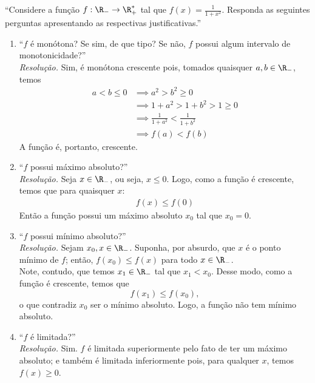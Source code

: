 \enquote{Considere a função $f: \R_- \rightarrow \R_+^*$ tal que $f(x) = \frac{1}{1 + x^2}$. Responda as seguintes perguntas apresentando as respectivas justificativas.}
\begin{enumerate}
    \item \enquote{$f$ é monótona? Se sim, de que tipo? Se não, $f$ possui algum intervalo de monotonicidade?} \\
    \emph{Resolução.} Sim, é monótona crescente pois, tomados quaisquer $a, b \in \R_-$, temos
    \begin{align*}
        a < b \le 0 & \implies a^2 > b^2 \ge 0 \\ & \implies
        1 + a^2 > 1 + b^2 > 1 \ge 0 \\ & \implies
        \frac{1}{1 + a^2} < \frac{1}{1 + b^2} \\ & \implies
        f(a) < f(b)
    \end{align*}
    A função é, portanto, crescente.
    \item \enquote{$f$ possui máximo absoluto?} \\
    \emph{Resolução.} Seja $x \in \R_-$, ou seja, $x \le 0$. Logo, como a função é crescente, temos que para quaisquer $x$:
    \begin{align*}
        f(x) \le f(0)
    \end{align*}
    Então a função possui um máximo absoluto $x_0$ tal que $x_0 = 0$. 
    \item \enquote{$f$ possui mínimo absoluto?} \\
    \emph{Resolução.} Sejam $x_0, x \in \R_-$. Suponha, por absurdo, que $x$ é o ponto mínimo de $f$; então, $f(x_0) \le f(x)$ para todo $x \in \R_-$. \\ Note, contudo, que temos $x_1 \in \R_-$ tal que $x_1 < x_0$. Desse modo, como a função é crescente, temos que
    \begin{displaymath}
        f(x_1) \le f(x_0),
    \end{displaymath}
    o que contradiz $x_0$ ser o mínimo absoluto. Logo, a função não tem mínimo absoluto.
    \item \enquote{$f$ é limitada?} \\
    \emph{Resolução.} Sim. $f$ é limitada superiormente pelo fato de ter um máximo absoluto; e também é limitada inferiormente pois, para qualquer $x$, temos $f(x) \ge 0$.
\end{enumerate}